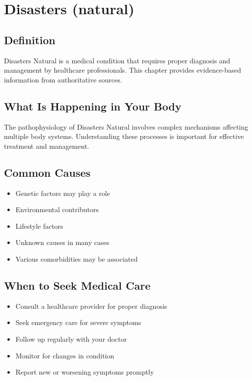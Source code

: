 
\chapter{Disasters (natural)}

\section*{Definition}
Disasters Natural is a medical condition that requires proper diagnosis and management by healthcare professionals. This chapter provides evidence-based information from authoritative sources.

\section*{What Is Happening in Your Body}
The pathophysiology of Disasters Natural involves complex mechanisms affecting multiple body systems. Understanding these processes is important for effective treatment and management.

\section*{Common Causes}
\begin{itemize}
  \item Genetic factors may play a role
  \item Environmental contributors
  \item Lifestyle factors
  \item Unknown causes in many cases
  \item Various comorbidities may be associated
\end{itemize}

\section*{When to Seek Medical Care}
\begin{itemize}
  \item Consult a healthcare provider for proper diagnosis
  \item Seek emergency care for severe symptoms
  \item Follow up regularly with your doctor
  \item Monitor for changes in condition
  \item Report new or worsening symptoms promptly
\end{itemize}

